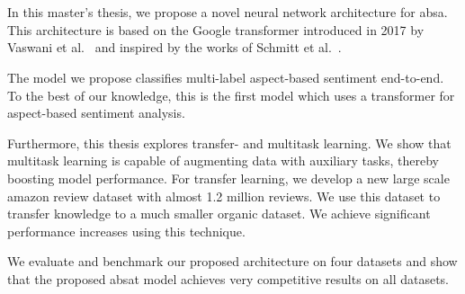 \chapter{\abstractname}

In this master's thesis, we propose a novel neural network architecture for \acrfull{absa}. This architecture is based on the Google transformer introduced in 2017 by Vaswani et al.~\cite{Vaswani2017} and inspired by the works of Schmitt et al.~\cite{Schmitt2018}.
\medskip

The model we propose classifies multi-label aspect-based sentiment end-to-end. To the best of our knowledge, this is the first model which uses a transformer for aspect-based sentiment analysis.
\medskip

Furthermore, this thesis explores transfer- and multitask learning. We show that multitask learning is capable of augmenting data with auxiliary tasks, thereby boosting model performance. For transfer learning, we develop a new large scale amazon review dataset with almost 1.2 million reviews. We use this dataset to transfer knowledge to a much smaller organic dataset. We achieve significant performance increases using this technique.
\medskip

We evaluate and benchmark our proposed architecture on four datasets and show that the proposed \acrfull{absat} model achieves very competitive results on all datasets.

